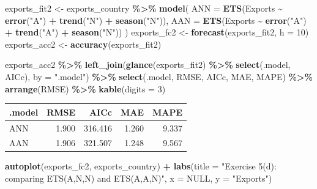 \documentclass[
  11pt,
]{article}
\newenvironment{Shaded}{\begin{snugshade}}{\end{snugshade}}
\newcommand{\AttributeTok}[1]{\textcolor[rgb]{0.13,0.29,0.53}{#1}}
\newcommand{\ConstantTok}[1]{\textcolor[rgb]{0.56,0.35,0.01}{#1}}
\newcommand{\DecValTok}[1]{\textcolor[rgb]{0.00,0.00,0.81}{#1}}
\newcommand{\FunctionTok}[1]{\textcolor[rgb]{0.13,0.29,0.53}{\textbf{#1}}}
\newcommand{\NormalTok}[1]{#1}
\newcommand{\OtherTok}[1]{\textcolor[rgb]{0.56,0.35,0.01}{#1}}
\newcommand{\SpecialCharTok}[1]{\textcolor[rgb]{0.81,0.36,0.00}{\textbf{#1}}}
\newcommand{\StringTok}[1]{\textcolor[rgb]{0.31,0.60,0.02}{#1}}
\newcounter{none} %
\begin{document}
\begin{Shaded}
\begin{Highlighting}[]
\NormalTok{exports\_fit2 }\OtherTok{\textless{}{-}}\NormalTok{ exports\_country }\SpecialCharTok{\%\textgreater{}\%}
  \FunctionTok{model}\NormalTok{(}
    \AttributeTok{ANN =} \FunctionTok{ETS}\NormalTok{(Exports }\SpecialCharTok{\textasciitilde{}} \FunctionTok{error}\NormalTok{(}\StringTok{"A"}\NormalTok{) }\SpecialCharTok{+} \FunctionTok{trend}\NormalTok{(}\StringTok{"N"}\NormalTok{) }\SpecialCharTok{+} \FunctionTok{season}\NormalTok{(}\StringTok{"N"}\NormalTok{)),}
    \AttributeTok{AAN =} \FunctionTok{ETS}\NormalTok{(Exports }\SpecialCharTok{\textasciitilde{}} \FunctionTok{error}\NormalTok{(}\StringTok{"A"}\NormalTok{) }\SpecialCharTok{+} \FunctionTok{trend}\NormalTok{(}\StringTok{"A"}\NormalTok{) }\SpecialCharTok{+} \FunctionTok{season}\NormalTok{(}\StringTok{"N"}\NormalTok{))}
\NormalTok{  )}
\NormalTok{exports\_fc2 }\OtherTok{\textless{}{-}} \FunctionTok{forecast}\NormalTok{(exports\_fit2, }\AttributeTok{h =} \DecValTok{10}\NormalTok{)}
\NormalTok{exports\_acc2 }\OtherTok{\textless{}{-}} \FunctionTok{accuracy}\NormalTok{(exports\_fit2)}

\NormalTok{exports\_acc2 }\SpecialCharTok{\%\textgreater{}\%}
  \FunctionTok{left\_join}\NormalTok{(}\FunctionTok{glance}\NormalTok{(exports\_fit2) }\SpecialCharTok{\%\textgreater{}\%} \FunctionTok{select}\NormalTok{(.model, AICc), }\AttributeTok{by =} \StringTok{".model"}\NormalTok{) }\SpecialCharTok{\%\textgreater{}\%}
  \FunctionTok{select}\NormalTok{(.model, RMSE, AICc, MAE, MAPE) }\SpecialCharTok{\%\textgreater{}\%}
  \FunctionTok{arrange}\NormalTok{(RMSE) }\SpecialCharTok{\%\textgreater{}\%}
  \FunctionTok{kable}\NormalTok{(}\AttributeTok{digits =} \DecValTok{3}\NormalTok{)}
\end{Highlighting}
\end{Shaded}

{\def\LTcaptype{none} %
\begin{longtable}[]{@{}lrrrr@{}}
\toprule\noalign{}
.model & RMSE & AICc & MAE & MAPE \\
\midrule\noalign{}
\endhead
\bottomrule\noalign{}
\endlastfoot
ANN & 1.900 & 316.416 & 1.260 & 9.337 \\
AAN & 1.906 & 321.507 & 1.248 & 9.567 \\
\end{longtable}
}

\begin{Shaded}
\begin{Highlighting}[]
\FunctionTok{autoplot}\NormalTok{(exports\_fc2, exports\_country) }\SpecialCharTok{+}
  \FunctionTok{labs}\NormalTok{(}\AttributeTok{title =} \StringTok{"Exercise 5(d): comparing ETS(A,N,N) and ETS(A,A,N)"}\NormalTok{, }\AttributeTok{x =} \ConstantTok{NULL}\NormalTok{, }\AttributeTok{y =} \StringTok{"Exports"}\NormalTok{)}
\end{Highlighting}
\end{Shaded}
\end{document}
